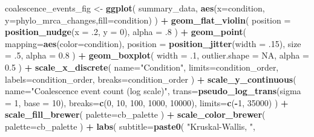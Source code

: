 \documentclass[]{book}
\newenvironment{Shaded}{\begin{snugshade}}{\end{snugshade}}
\newcommand{\DataTypeTok}[1]{\textcolor[rgb]{0.13,0.29,0.53}{#1}}
\newcommand{\DecValTok}[1]{\textcolor[rgb]{0.00,0.00,0.81}{#1}}
\newcommand{\FloatTok}[1]{\textcolor[rgb]{0.00,0.00,0.81}{#1}}
\newcommand{\KeywordTok}[1]{\textcolor[rgb]{0.13,0.29,0.53}{\textbf{#1}}}
\newcommand{\NormalTok}[1]{#1}
\newcommand{\OperatorTok}[1]{\textcolor[rgb]{0.81,0.36,0.00}{\textbf{#1}}}
\newcommand{\OtherTok}[1]{\textcolor[rgb]{0.56,0.35,0.01}{#1}}
\newcommand{\StringTok}[1]{\textcolor[rgb]{0.31,0.60,0.02}{#1}}
\begin{document}
\begin{Shaded}
\begin{Highlighting}[]
{{{{\NormalTok{coalescence_events_fig <-}\StringTok{ }\KeywordTok{ggplot}\NormalTok{(}
\NormalTok{    summary_data,}
    \KeywordTok{aes}\NormalTok{(}\DataTypeTok{x=}\NormalTok{condition, }\DataTypeTok{y=}\NormalTok{phylo_mrca_changes,}\DataTypeTok{fill=}\NormalTok{condition)}
\NormalTok{  ) }\OperatorTok{+}
\StringTok{  }\KeywordTok{geom_flat_violin}\NormalTok{(}
    \DataTypeTok{position =} \KeywordTok{position_nudge}\NormalTok{(}\DataTypeTok{x =} \FloatTok{.2}\NormalTok{, }\DataTypeTok{y =} \DecValTok{0}\NormalTok{),}
    \DataTypeTok{alpha =} \FloatTok{.8}
\NormalTok{  ) }\OperatorTok{+}
\StringTok{  }\KeywordTok{geom_point}\NormalTok{(}
    \DataTypeTok{mapping=}\KeywordTok{aes}\NormalTok{(}\DataTypeTok{color=}\NormalTok{condition),}
    \DataTypeTok{position =} \KeywordTok{position_jitter}\NormalTok{(}\DataTypeTok{width =} \FloatTok{.15}\NormalTok{),}
    \DataTypeTok{size =} \FloatTok{.5}\NormalTok{,}
    \DataTypeTok{alpha =} \FloatTok{0.8}
\NormalTok{  ) }\OperatorTok{+}
\StringTok{  }\KeywordTok{geom_boxplot}\NormalTok{(}
    \DataTypeTok{width =} \FloatTok{.1}\NormalTok{,}
    \DataTypeTok{outlier.shape =} \OtherTok{NA}\NormalTok{,}
    \DataTypeTok{alpha =} \FloatTok{0.5}
\NormalTok{  ) }\OperatorTok{+}
\StringTok{  }\KeywordTok{scale_x_discrete}\NormalTok{(}
    \DataTypeTok{name=}\StringTok{"Condition"}\NormalTok{,}
    \DataTypeTok{limits=}\NormalTok{condition_order,}
    \DataTypeTok{labels=}\NormalTok{condition_order,}
    \DataTypeTok{breaks=}\NormalTok{condition_order}
\NormalTok{  ) }\OperatorTok{+}
\StringTok{  }\KeywordTok{scale_y_continuous}\NormalTok{(}
    \DataTypeTok{name=}\StringTok{"Coalescence event count (log scale)"}\NormalTok{,}
    \DataTypeTok{trans=}\KeywordTok{pseudo_log_trans}\NormalTok{(}\DataTypeTok{sigma =} \DecValTok{1}\NormalTok{, }\DataTypeTok{base =} \DecValTok{10}\NormalTok{),}
    \DataTypeTok{breaks=}\KeywordTok{c}\NormalTok{(}\DecValTok{0}\NormalTok{, }\DecValTok{10}\NormalTok{, }\DecValTok{100}\NormalTok{, }\DecValTok{1000}\NormalTok{, }\DecValTok{10000}\NormalTok{),}
    \DataTypeTok{limits=}\KeywordTok{c}\NormalTok{(}\OperatorTok{-}\DecValTok{1}\NormalTok{, }\DecValTok{35000}\NormalTok{)}
\NormalTok{  ) }\OperatorTok{+}
\StringTok{  }\KeywordTok{scale_fill_brewer}\NormalTok{(}
    \DataTypeTok{palette=}\NormalTok{cb_palette}
\NormalTok{  ) }\OperatorTok{+}
\StringTok{  }\KeywordTok{scale_color_brewer}\NormalTok{(}
    \DataTypeTok{palette=}\NormalTok{cb_palette}
\NormalTok{  ) }\OperatorTok{+}
\StringTok{  }\KeywordTok{labs}\NormalTok{(}
    \DataTypeTok{subtitle=}\KeywordTok{paste0}\NormalTok{(}
      \StringTok{"Kruskal-Wallis, "}\NormalTok{,}
}}}}
\end{Highlighting}
\end{Shaded}
\end{document}
